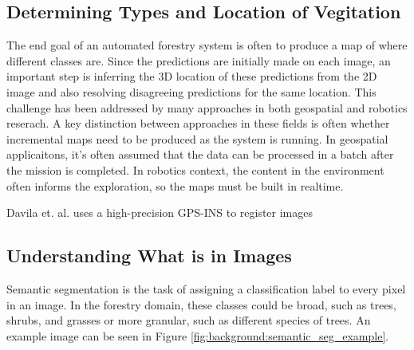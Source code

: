 \subsection{Determining Types and Location of Vegitation}
The end goal of an automated forestry system is often to produce a map of where different classes are. Since the predictions are initially made on each image, an important step is inferring the 3D location of these predictions from the 2D image and also resolving disagreeing predictions for the same location. This challenge has been addressed by many approaches in both geospatial and robotics reserach. A key distinction between approaches in these fields is often whether incremental maps need to be produced as the system is running. In geospatial applicaitons, it's often assumed that the data can be processed in a batch after the mission is completed. In robotics context, the content in the environment often informs the exploration, so the maps must be built in realtime. 

Davila et. al. uses a high-precision GPS-INS to register images \cite{Davila2022ADAPT:AI}


\subsection{Understanding What is in Images}
Semantic segmentation is the task of assigning a classification label to every pixel in an image. In the forestry domain, these classes could be broad, such as trees, shrubs, and grasses or more granular, such as different species of trees. An example image can be seen in Figure \ref{fig:background:semantic_seg_example}.

